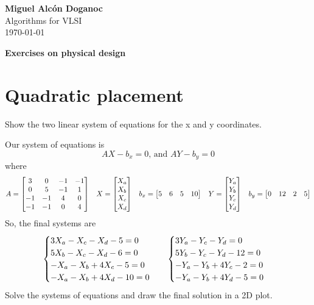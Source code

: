 \documentclass[a4paper, 10pt]{article}
\begin{document}
\noindent
\begin{flushright}
    \large\textbf{Miguel Alcón Doganoc} \\
    Algorithms for VLSI \\
    \today
\end{flushright}

\noindent
{\huge{\textbf{Exercises on physical design}}}

\section{Quadratic placement}
{\color{statement} 
Show the two linear system of equations for the x and y coordinates.
}

Our system of equations is
\[
     AX - b_x = 0\text{, and } AY - b_y = 0
\]
where
\[
    A = \begin{bmatrix}
        3 & 0 & -1 & -1 \\
        0 & 5 & -1 & 1 \\
        -1 & -1 & 4 & 0 \\
        -1 & -1 & 0 & 4
    \end{bmatrix}\hspace{3mm}
    X = \begin{bmatrix}
        X_a \\
        X_b \\
        X_c \\
        X_d \\
    \end{bmatrix}\hspace{3mm}
    b_x = \begin{bmatrix}
        5 & 6 & 5 & 10
    \end{bmatrix}\hspace{3mm}
    Y = \begin{bmatrix}
        Y_a \\
        Y_b \\
        Y_c \\
        Y_d
    \end{bmatrix}  \hspace{3mm}
    b_y = \begin{bmatrix}
        0 & 12 & 2 & 5
    \end{bmatrix}
\]
So, the final systems are
\[
    \begin{cases}
        3 X_a - X_c - X_d - 5 = 0  \\
        5 X_b - X_c - X_d - 6 = 0 \\
        - X_a - X_b + 4 X_c - 5 = 0 \\
        - X_a - X_b + 4X_d - 10 = 0 \\
    \end{cases}\hspace{3mm}
    \begin{cases}
        3 Y_a - Y_c - Y_d = 0  \\
        5 Y_b - Y_c - Y_d - 12 = 0 \\
        - Y_a - Y_b + 4 Y_c - 2 = 0 \\
        - Y_a - Y_b + 4Y_d - 5 = 0 \\
    \end{cases}
\]
{\color{statement} 
Solve the systems of equations and draw the final solution in a 2D plot.
}
\end{document}
